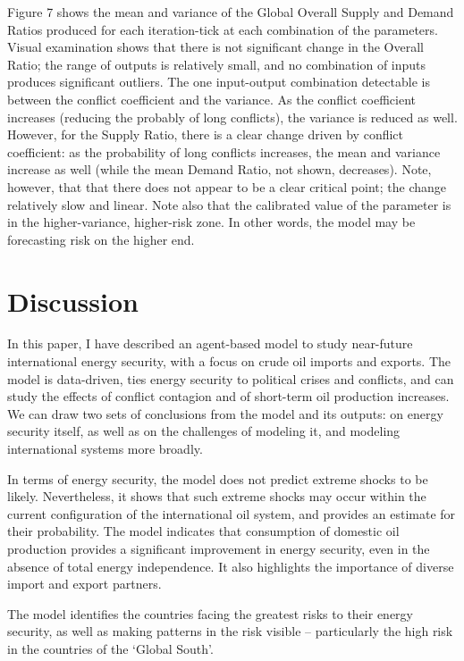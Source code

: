 \documentclass{article}
\begin{document}
Figure 7 shows the mean and variance of the Global Overall Supply and Demand Ratios produced for each iteration-tick at each combination of the parameters. Visual examination shows that there is not significant change in the Overall Ratio; the range of outputs is relatively small, and no combination of inputs produces significant outliers. The one input-output combination detectable is between the conflict coefficient and the variance. As the conflict coefficient increases (reducing the probably of long conflicts), the variance is reduced as well. However, for the Supply Ratio, there is a clear change driven by conflict coefficient: as the probability of long conflicts increases, the mean and variance increase as well (while the mean Demand Ratio, not shown, decreases). Note, however, that that there does not appear to be a clear critical point; the change relatively slow and linear. Note also that the calibrated value of the parameter is in the higher-variance, higher-risk zone. In other words, the model may be forecasting risk on the higher end. 



\section{Discussion}

In this paper, I have described an agent-based model to study near-future international energy security, with a focus on crude oil imports and exports. The model is data-driven, ties energy security to political crises and conflicts, and can study the effects of conflict contagion and of short-term oil production increases. We can draw two sets of conclusions from the model and its outputs: on energy security itself, as well as on the challenges of modeling it, and modeling international systems more broadly.

In terms of energy security, the model does not predict extreme shocks to be likely. Nevertheless, it shows that such extreme shocks may occur within the current configuration of the international oil system, and provides an estimate for their probability. The model indicates that consumption of domestic oil production provides a significant improvement in energy security, even in the absence of total energy independence. It also highlights the importance of diverse import and export partners. 

The model identifies the countries facing the greatest risks to their energy security, as well as making patterns in the risk visible -- particularly the high risk in the countries of the `Global South'. 
\end{document}

